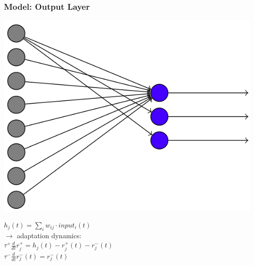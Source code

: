 \begin{frame}
\frametitle{Model: Output Layer}
\begin{multicols}{2}
\begin{center}
\includegraphics[scale=.1]{pics/model_output}
\end{center}
\columnbreak
\begin{center}
$h_j(t) = \sum_i w_{ij} \cdot input_i(t)$\\
\vskip 6mm
$\rightarrow$ adaptation dynamics:\\
\vskip 3mm
$\tau^+\frac{d}{dt}r^+_j=h_j(t)-r^+_j(t)-r^-_j(t)$\\
\vskip 3mm
$\tau^-\frac{d}{dt}r^-_j(t)=r^-_j(t)$
\vskip 5mm
\end{center}
\end{multicols}
\end{frame}

